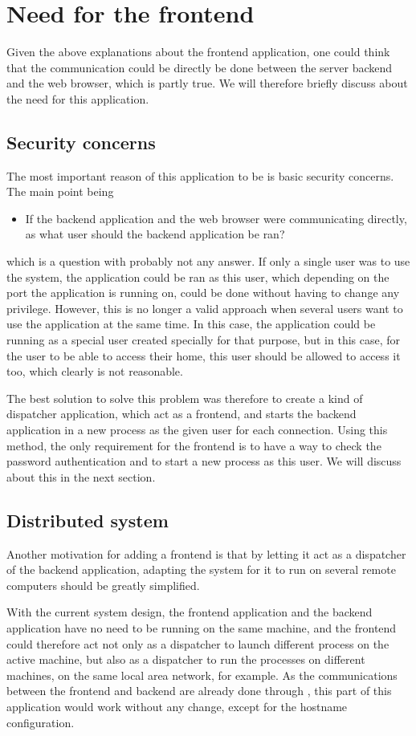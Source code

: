 \section{Need for the frontend}
Given the above explanations about the frontend application, one could 
think that the communication could be directly be done between the 
server backend and the web browser, which is partly true. We will therefore
briefly discuss about the need for this application.
%
\subsection{Security concerns}
The most important reason of this application to be is basic security concerns. 
The main point being
\begin{itemize}
\item If the backend application and the web browser were communicating directly, 
  as what user should the backend application be ran?   
\end{itemize}
which is a question with probably not any answer. If only a single user was to 
use the system, the application could be ran as this user, which depending on the 
port the application is running on, could be done without having to change any privilege.
However, this is no longer a valid approach when several users want to use the application 
at the same time. In this case, the application could be running as a special user 
created specially for that purpose, but in this case, for the user to be able to access 
their home, this user should be allowed to access it too, which clearly is not reasonable.

The best solution to solve this problem was therefore to create a kind of dispatcher application, 
which act as a frontend, and starts the backend application in a new process as the given user 
for each connection. Using this method, the only requirement for the frontend is to have a
way to check the password authentication and to start a new process as this user. We will 
discuss about this in the next section.
%
\subsection{Distributed system}
Another motivation for adding a frontend is that by letting it act as a dispatcher 
of the backend application, adapting the system for it to run on several remote computers
should be greatly simplified. 

With the current system design, the frontend application and the backend application have no need 
to be running on the same machine, and the frontend could therefore act not only as a dispatcher 
to launch different process on the active machine, but also as a dispatcher to run the processes 
on different machines, on the same local area network, for example. As the communications 
between the frontend and backend are already done through , this part of this 
application would work without any change, except for the hostname configuration.